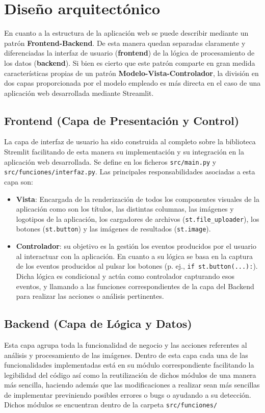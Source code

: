 \section{Diseño arquitectónico}
En cuanto a la estructura de la aplicación web se puede describir mediante un patrón \textbf{Frontend-Backend}. De esta manera quedan separadas claramente y diferenciadas la interfaz de usuario (\textbf{frontend}) de la lógica de procesamiento de los datos (\textbf{backend}). Si bien es cierto que este patrón comparte en gran medida características propias de un patrón \textbf{Modelo-Vista-Controlador}, la división en dos capas proporcionada por el modelo empleado es más directa en el caso de una aplicación web desarrollada mediante Streamlit.

\subsection{Frontend (Capa de Presentación y Control)}
La capa de interfaz de usuario ha sido construida al completo sobre la biblioteca Stremlit facilitando de esta manera su implementación y su integración en la aplicación web desarrollada. Se define en los ficheros \texttt{src/main.py} y \texttt{src/funciones/interfaz.py}. Las principales responsabilidades asociadas a esta capa son:
\begin{itemize}
    \item \textbf{Vista}: Encargada de la renderización de todos los componentes visuales de la aplicación como son los títulos, las distintas columnas, las imágenes y logotipos de la aplicación,  los cargadores de archivos (\verb|st.file_uploader|), los botones (\verb|st.button|) y las imágenes de resultados (\verb|st.image|).
    \item \textbf{Controlador}: su objetivo es la gestión los eventos producidos por el usuario al interactuar con la aplicación. En cuanto a su lógica se basa en la captura de los eventos producidos al pulsar los botones (p. ej., \verb|if st.button(...):|). Dicha lógica es condicional y actúa como controlador capturando esos eventos, y llamando a las funciones correspondientes de la capa del Backend para realizar las acciones o análisis pertinentes. 

\end{itemize}

\subsection{Backend (Capa de Lógica y Datos)}
Esta capa agrupa toda la funcionalidad de negocio y las acciones referentes al análisis y procesamiento de las imágenes. Dentro de esta capa cada una de las funcionalidades implementadas está en su módulo correspondiente facilitando la legibilidad del código así como la reutilización de dichos módulos de una manera más sencilla, haciendo además que las modificaciones a realizar sean más sencillas de implementar previniendo posibles errores o bugs o ayudando a su detección. Dichos módulos se encuentran dentro de la carpeta \texttt{src/funciones/} 

